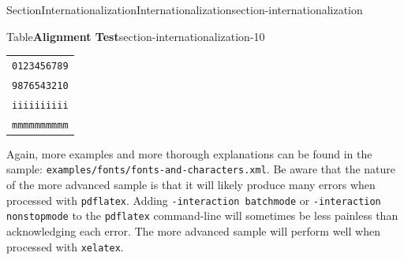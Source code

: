 \documentclass[twoside,10pt,]{article}
\newcommand{\tabularfont}{\relax}
\newcommand{\mono}[1]{\texttt{#1}}
\numberwithin{equation}{section}
\begin{document}
\begin{sectionptx}{Section}{Internationalization}{}{Internationalization}{}{}{section-internationalization}
\begin{tableptx}{Table}{\textbf{Alignment Test}}{section-internationalization-10}{}
\centering%
{\tabularfont%
\begin{tabular}{l}
\mono{0123456789}\tabularnewline[0pt]
\mono{9876543210}\tabularnewline[0pt]
\mono{iiiiiiiiii}\tabularnewline[0pt]
\mono{mmmmmmmmmm}
\end{tabular}
}%
\end{tableptx}%
Again, more examples and more thorough explanations can be found in the sample: \mono{examples/fonts/fonts-and-characters.xml}.  Be aware that the nature of the more advanced sample is that it will likely produce many errors when processed with \mono{pdflatex}.  Adding \mono{-interaction batchmode} or \mono{-interaction nonstopmode} to the \mono{pdflatex} command-line will sometimes be less painless than acknowledging each error.  The more advanced sample will perform well when processed with \mono{xelatex}.%
\end{sectionptx}
%
%
\typeout{************************************************}
\typeout{************************************************}
%
\end{document}
